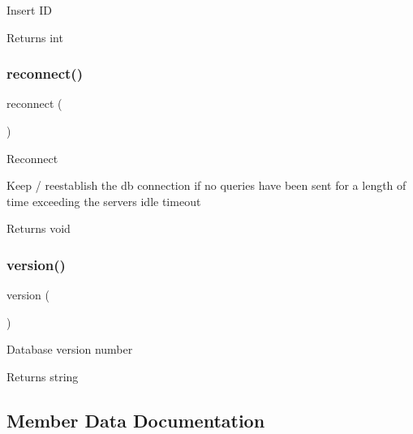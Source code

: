 Insert ID

\begin{DoxyReturn}{Returns}
int 
\end{DoxyReturn}
\mbox{\label{class_c_i___d_b__mysql__driver_a57c19c642ab3023e28d10c50f86ff0a8}} 
\subsubsection{\texorpdfstring{reconnect()}{reconnect()}}
{\footnotesize\ttfamily reconnect (\begin{DoxyParamCaption}{ }\end{DoxyParamCaption})}

Reconnect

Keep / reestablish the db connection if no queries have been sent for a length of time exceeding the server\textquotesingle{}s idle timeout

\begin{DoxyReturn}{Returns}
void 
\end{DoxyReturn}
\mbox{\label{class_c_i___d_b__mysql__driver_a6080dae0886626b9a4cedb29240708b1}} 
\subsubsection{\texorpdfstring{version()}{version()}}
{\footnotesize\ttfamily version (\begin{DoxyParamCaption}{ }\end{DoxyParamCaption})}

Database version number

\begin{DoxyReturn}{Returns}
string 
\end{DoxyReturn}


\subsection{Member Data Documentation}
\mbox{\label{class_c_i___d_b__mysql__driver_aaec2fb0112850159063a8e47ad3aed6e}} 
